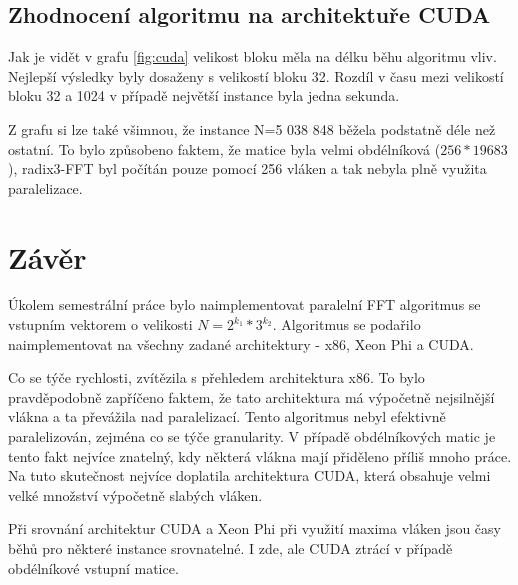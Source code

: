 \documentclass[12pt]{article}
\begin{document}
\newpage
\subsection{Zhodnocení algoritmu na architektuře CUDA}
Jak je vidět v grafu \ref{fig:cuda} velikost bloku měla na délku běhu algoritmu vliv. Nejlepší výsledky byly dosaženy s velikostí bloku 32. Rozdíl v času mezi velikostí bloku 32 a 1024 v případě největší instance byla jedna sekunda.\par
Z grafu si lze také všimnou, že instance N=5 038 848 běžela podstatně déle než ostatní. To bylo způsobeno faktem, že matice byla velmi obdélníková ($256*19683$), radix3-FFT byl počítán pouze pomocí 256 vláken a tak nebyla plně využita paralelizace.
\section{Závěr}
Úkolem semestrální práce bylo naimplementovat paralelní FFT algoritmus se vstupním vektorem o velikosti $N=2^{k_{1}}*3^{k_{2}}$. Algoritmus se podařilo naimplementovat na všechny zadané architektury - x86, Xeon Phi a CUDA.\par
Co se týče rychlosti, zvítězila s přehledem architektura x86. To bylo pravděpodobně zapříčeno faktem, že tato architektura má výpočetně nejsilnější vlákna a ta převážila nad paralelizací. Tento algoritmus nebyl efektivně paralelizován, zejména co se týče granularity. V případě obdélníkových matic je tento fakt nejvíce znatelný, kdy některá vlákna mají přiděleno příliš mnoho práce. Na tuto skutečnost nejvíce doplatila architektura CUDA, která obsahuje velmi velké množství výpočetně slabých vláken.\par
Při srovnání architektur CUDA a Xeon Phi při využití maxima vláken jsou časy běhů pro některé instance srovnatelné. I zde, ale CUDA ztrácí v případě obdélníkové vstupní matice. 
\appendix
\end{document}
